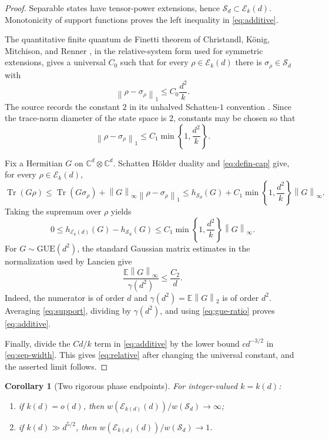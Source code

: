 \documentclass[11pt]{article}
\newtheorem{corollary}{Corollary}
\newcommand{\C}{\mathbb C}
\newcommand{\Eset}{\mathcal E}
\newcommand{\Sep}{\mathcal S}
\newcommand{\Tr}{\operatorname{Tr}}
\newcommand{\norm}[1]{\left\lVert#1\right\rVert}
\newcommand{\E}{\mathbb E}
\begin{document}
\begin{proof}
Separable states have tensor-power extensions, hence
$\Sep_d\subset\Eset_k(d)$.  Monotonicity of support functions proves the left inequality in \eqref{eq:additive}.

The quantitative finite quantum de Finetti theorem of Christandl, K\"onig, Mitchison, and Renner \cite{CKMR}, in the relative-system form used for symmetric extensions, gives a universal $C_0$ such that for every $\rho\in\Eset_k(d)$ there is $\sigma_\rho\in\Sep_d$ with
\begin{equation}\label{eq:defin}
 \norm{\rho-\sigma_\rho}_1\leq C_0\frac{d^2}{k}.
\end{equation}
The source records the constant $2$ in its unhalved Schatten-$1$ convention \cite[Section~1]{Lancien}.  Since the trace-norm diameter of the state space is $2$, constants may be chosen so that
\begin{equation}\label{eq:defin-cap}
 \norm{\rho-\sigma_\rho}_1\leq C_1\min\left\{1,\frac{d^2}{k}\right\}.
\end{equation}

Fix a Hermitian $G$ on $\C^d\otimes\C^d$.  Schatten H\"older duality and \eqref{eq:defin-cap} give, for every $\rho\in\Eset_k(d)$,
\[
 \Tr(G\rho)
 \leq \Tr(G\sigma_\rho)+\norm G_\infty\norm{\rho-\sigma_\rho}_1
 \leq h_{\Sep_d}(G)+C_1\min\left\{1,\frac{d^2}{k}\right\}\norm G_\infty.
\]
Taking the supremum over $\rho$ yields
\begin{equation}\label{eq:support}
 0\leq h_{\Eset_k(d)}(G)-h_{\Sep_d}(G)
 \leq C_1\min\left\{1,\frac{d^2}{k}\right\}\norm G_\infty.
\end{equation}
For $G\sim\mathrm{GUE}(d^2)$, the standard Gaussian matrix estimates in the normalization used by Lancien give
\begin{equation}\label{eq:gue-ratio}
 \frac{\E\norm G_\infty}{\gamma(d^2)}\leq\frac{C_2}{d}.
\end{equation}
Indeed, the numerator is of order $d$ and $\gamma(d^2)=\E\norm G_2$ is of order $d^2$.  Averaging \eqref{eq:support}, dividing by $\gamma(d^2)$, and using \eqref{eq:gue-ratio} proves \eqref{eq:additive}.

Finally, divide the $Cd/k$ term in \eqref{eq:additive} by the lower bound $c d^{-3/2}$ in \eqref{eq:sep-width}.  This gives \eqref{eq:relative} after changing the universal constant, and the asserted limit follows.
\end{proof}

\begin{corollary}[Two rigorous phase endpoints]\label{cor:endpoints}
For integer-valued $k=k(d)$:
\begin{enumerate}[label=\textup{(\roman*)}]
 \item if $k(d)=o(d)$, then
 $w(\Eset_{k(d)}(d))/w(\Sep_d)\to\infty$;
 \item if $k(d)\gg d^{5/2}$, then
 $w(\Eset_{k(d)}(d))/w(\Sep_d)\to1$.
\end{enumerate}
\end{corollary}
\end{document}
